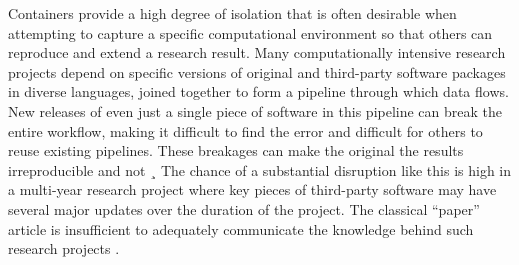 Containers provide a high degree of isolation that is often desirable
when attempting to capture a specific computational environment so that
others can reproduce and extend a research result. Many computationally
intensive research projects depend on specific versions of original and
third-party software packages in diverse languages, joined together to
form a pipeline through which data flows. New releases of even just a
single piece of software in this pipeline can break the entire workflow,
making it difficult to find the error and difficult for others to reuse
existing pipelines. These breakages can make the original the results
irreproducible and not ¸ The chance of a substantial disruption like
this is high in a multi-year research project where key pieces of
third-party software may have several major updates over the duration of
the project. The classical ``paper'' article is insufficient to
adequately communicate the knowledge behind such research projects
\citep[cf.][]{donoho_invitation_2010,marwick_how_2015}.

